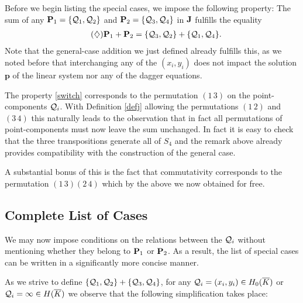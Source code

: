 \documentclass[english,11pt,a4paper]{article}
\begin{document}

Before we begin listing the special cases, we impose the following property: The sum of any $\P_1 = \{\q_1,\q_2\}$ and $\P_2 = \{\q_3,\q_4\}$ in $\J$ fulfills the equality
\begin{align*}
  \tag{$\diamondsuit$} \label{switch} \P_1 + \P_2 &= \{\q_3,\q_2\} + \{\q_1,\q_4\}.
\end{align*}
Note that the general-case addition we just defined already fulfills this, as we noted before that interchanging any of the $(x_i, y_i)$ does not impact the solution $\mathbf{p}$ of the linear system nor any of the dagger equations.

\begin{remark}\label{permut}
  The property \eqref{switch} corresponds to the permutation $(1 \, 3)$ on the point-components $\q_i$. With Definition \ref{defj} allowing the permutations $(1 \, 2)$ and $(3 \, 4)$ this naturally leads to the observation that in fact all permutations of point-components must now leave the sum unchanged. In fact it is easy to check that the three transpositions generate all of $S_4$ and the remark above already provides compatibility with the construction of the general case.

  A substantial bonus of this is the fact that commutativity corresponds to the permutation $(1 \, 3)(2 \, 4)$ which by the above we now obtained for free.
\end{remark}


\subsection{Complete List of Cases}

We may now impose conditions on the relations between the $\q_i$ without mentioning whether they belong to $\P_1$ or $\P_2$. As a result, the list of special cases can be written in a significantly more concise manner.

As we strive to define $\{ \q_1 , \q_2 \} + \{ \q_3 , \q_4 \}$, for any $\q_i = (x_i,y_i) \in \enkb$ or $\q_i = \infty \in \ekb$ we observe that the following simplification takes place:
\end{document}
